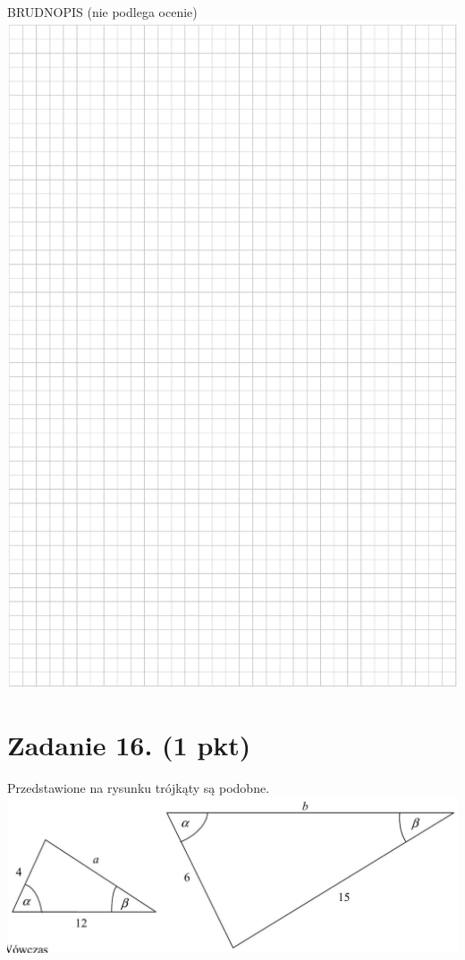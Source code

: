 \documentclass[10pt]{article}
\begin{document}
BRUDNOPIS (nie podlega ocenie)\\
\includegraphics[max width=\textwidth, center]{2024_11_21_e19607c15353cb4d7e48g-07}

\section*{Zadanie 16. (1 pkt)}
Przedstawione na rysunku trójkąty są podobne.\\
\includegraphics[max width=\textwidth, center]{2024_11_21_e19607c15353cb4d7e48g-08}
\end{document}
